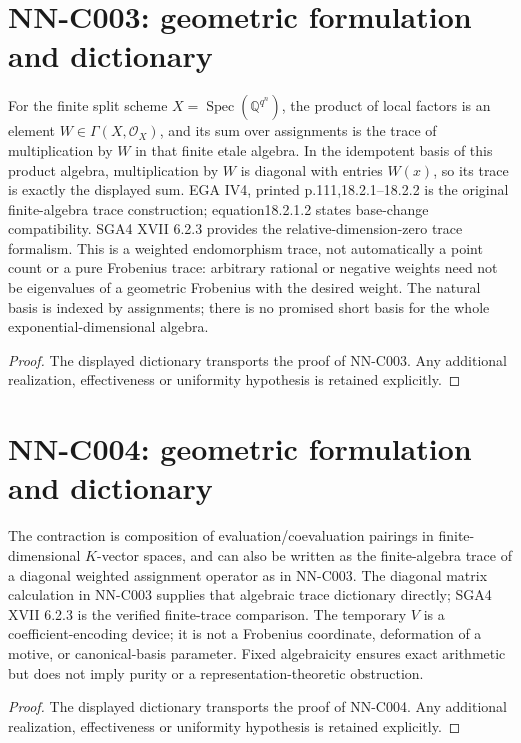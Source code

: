 \section{NN-C003: geometric formulation and dictionary}
\begin{geometricstatement}[NN-C003]
For the finite split scheme $X=\operatorname{Spec}(\mathbb Q^{q^n})$, the product of local factors is an element $W\in\Gamma(X,\mathcal O_X)$, and its sum over assignments is the trace of multiplication by $W$ in that finite etale algebra. In the idempotent basis of this product algebra, multiplication by $W$ is diagonal with entries $W(x)$, so its trace is exactly the displayed sum. EGA IV4, printed p.111,18.2.1--18.2.2 is the original finite-algebra trace construction; equation18.2.1.2 states base-change compatibility. SGA4 XVII 6.2.3 provides the relative-dimension-zero trace formalism. This is a weighted endomorphism trace, not automatically a point count or a pure Frobenius trace: arbitrary rational or negative weights need not be eigenvalues of a geometric Frobenius with the desired weight. The natural basis is indexed by assignments; there is no promised short basis for the whole exponential-dimensional algebra.
\end{geometricstatement}
\begin{proof} The displayed dictionary transports the proof of NN-C003. Any additional realization, effectiveness or uniformity hypothesis is retained explicitly.\end{proof}


\section{NN-C004: geometric formulation and dictionary}
\begin{geometricstatement}[NN-C004]
The contraction is composition of evaluation/coevaluation pairings in finite-dimensional $K$-vector spaces, and can also be written as the finite-algebra trace of a diagonal weighted assignment operator as in NN-C003. The diagonal matrix calculation in NN-C003 supplies that algebraic trace dictionary directly; SGA4 XVII 6.2.3 is the verified finite-trace comparison. The temporary $V$ is a coefficient-encoding device; it is not a Frobenius coordinate, deformation of a motive, or canonical-basis parameter. Fixed algebraicity ensures exact arithmetic but does not imply purity or a representation-theoretic obstruction.
\end{geometricstatement}
\begin{proof} The displayed dictionary transports the proof of NN-C004. Any additional realization, effectiveness or uniformity hypothesis is retained explicitly.\end{proof}


